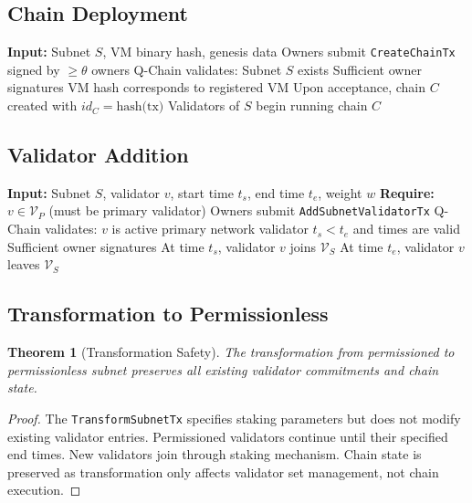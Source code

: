 \documentclass[11pt,a4paper]{article}
\newtheorem{theorem}{Theorem}
\begin{document}
\subsection{Chain Deployment}

\begin{algorithm}
\caption{Chain Deployment within Subnet}
\begin{algorithmic}[1]
\STATE \textbf{Input:} Subnet $S$, VM binary hash, genesis data
\STATE Owners submit \texttt{CreateChainTx} signed by $\geq \theta$ owners
\STATE Q-Chain validates:
    \STATE \quad Subnet $S$ exists
    \STATE \quad Sufficient owner signatures
    \STATE \quad VM hash corresponds to registered VM
\STATE Upon acceptance, chain $C$ created with $id_C = \text{hash(tx)}$
\STATE Validators of $S$ begin running chain $C$
\end{algorithmic}
\end{algorithm}

\subsection{Validator Addition}

\begin{algorithm}
\caption{Add Validator to Permissioned Subnet}
\begin{algorithmic}[1]
\STATE \textbf{Input:} Subnet $S$, validator $v$, start time $t_s$, end time $t_e$, weight $w$
\STATE \textbf{Require:} $v \in \mathcal{V}_P$ (must be primary validator)
\STATE Owners submit \texttt{AddSubnetValidatorTx}
\STATE Q-Chain validates:
    \STATE \quad $v$ is active primary network validator
    \STATE \quad $t_s < t_e$ and times are valid
    \STATE \quad Sufficient owner signatures
\STATE At time $t_s$, validator $v$ joins $\mathcal{V}_S$
\STATE At time $t_e$, validator $v$ leaves $\mathcal{V}_S$
\end{algorithmic}
\end{algorithm}

\subsection{Transformation to Permissionless}

\begin{theorem}[Transformation Safety]
The transformation from permissioned to permissionless subnet preserves all existing validator commitments and chain state.
\end{theorem}

\begin{proof}
The \texttt{TransformSubnetTx} specifies staking parameters but does not modify existing validator entries. Permissioned validators continue until their specified end times. New validators join through staking mechanism. Chain state is preserved as transformation only affects validator set management, not chain execution.
\end{proof}
\end{document}
